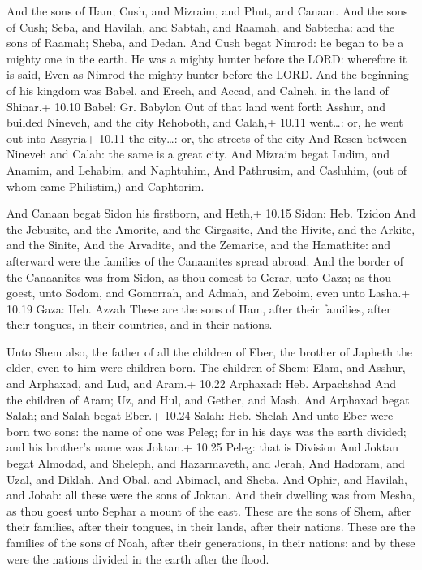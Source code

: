  And the sons of Ham; Cush, and Mizraim, and Phut, and
Canaan.  And the sons of Cush; Seba, and Havilah, and
Sabtah, and Raamah, and Sabtecha: and the sons of Raamah; Sheba, and
Dedan.  And Cush begat Nimrod: he began to be a mighty one
in the earth.  He was a mighty hunter before the LORD:
wherefore it is said, Even as Nimrod the mighty hunter before the LORD.
 And the beginning of his kingdom was Babel, and Erech, and
Accad, and Calneh, in the land of Shinar.+ 10.10 Babel: Gr. Babylon
 Out of that land went forth Asshur, and builded Nineveh,
and the city Rehoboth, and Calah,+ 10.11 went\ldots: or, he went out
into Assyria+ 10.11 the city\ldots: or, the streets of the city
 And Resen between Nineveh and Calah: the same is a great
city.  And Mizraim begat Ludim, and Anamim, and Lehabim,
and Naphtuhim,  And Pathrusim, and Casluhim, (out of whom
came Philistim,) and Caphtorim.

 And Canaan begat Sidon his firstborn, and Heth,+ 10.15
Sidon: Heb. Tzidon  And the Jebusite, and the Amorite, and
the Girgasite,  And the Hivite, and the Arkite, and the
Sinite,  And the Arvadite, and the Zemarite, and the
Hamathite: and afterward were the families of the Canaanites spread
abroad.  And the border of the Canaanites was from Sidon,
as thou comest to Gerar, unto Gaza; as thou goest, unto Sodom, and
Gomorrah, and Admah, and Zeboim, even unto Lasha.+ 10.19 Gaza: Heb.
Azzah  These are the sons of Ham, after their families,
after their tongues, in their countries, and in their nations.

 Unto Shem also, the father of all the children of Eber,
the brother of Japheth the elder, even to him were children born.
 The children of Shem; Elam, and Asshur, and Arphaxad, and
Lud, and Aram.+ 10.22 Arphaxad: Heb. Arpachshad  And the
children of Aram; Uz, and Hul, and Gether, and Mash.  And
Arphaxad begat Salah; and Salah begat Eber.+ 10.24 Salah: Heb. Shelah
 And unto Eber were born two sons: the name of one was
Peleg; for in his days was the earth divided; and his brother's name was
Joktan.+ 10.25 Peleg: that is Division  And Joktan begat
Almodad, and Sheleph, and Hazarmaveth, and Jerah,  And
Hadoram, and Uzal, and Diklah,  And Obal, and Abimael, and
Sheba,  And Ophir, and Havilah, and Jobab: all these were
the sons of Joktan.  And their dwelling was from Mesha, as
thou goest unto Sephar a mount of the east.  These are the
sons of Shem, after their families, after their tongues, in their lands,
after their nations.  These are the families of the sons of
Noah, after their generations, in their nations: and by these were the
nations divided in the earth after the flood.

